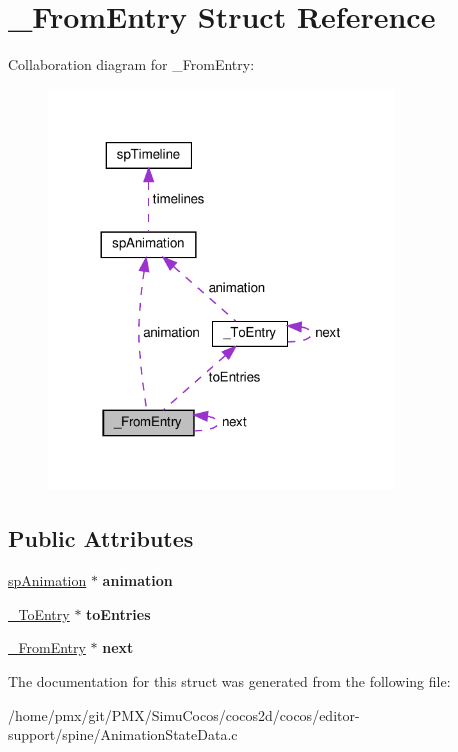 \hypertarget{struct__FromEntry}{}\section{\+\_\+\+From\+Entry Struct Reference}
\label{struct__FromEntry}


Collaboration diagram for \+\_\+\+From\+Entry\+:
\nopagebreak
\begin{figure}[H]
\begin{center}
\leavevmode
\includegraphics[width=260pt]{struct__FromEntry__coll__graph}
\end{center}
\end{figure}
\subsection*{Public Attributes}
\begin{DoxyCompactItemize}
\item 
\mbox{\label{struct__FromEntry_ac971a5aa97313ea22fdb7a9aa4e5c5d7}} 
\hyperlink{structspAnimation}{sp\+Animation} $\ast$ {\bfseries animation}
\item 
\mbox{\label{struct__FromEntry_ae0ada9f41fc11ec7579f0f232bf7cd89}} 
\hyperlink{struct__ToEntry}{\+\_\+\+To\+Entry} $\ast$ {\bfseries to\+Entries}
\item 
\mbox{\label{struct__FromEntry_a93cf2bef97b1218ad02af65cc0a65ad9}} 
\hyperlink{struct__FromEntry}{\+\_\+\+From\+Entry} $\ast$ {\bfseries next}
\end{DoxyCompactItemize}


The documentation for this struct was generated from the following file\+:\begin{DoxyCompactItemize}
\item 
/home/pmx/git/\+P\+M\+X/\+Simu\+Cocos/cocos2d/cocos/editor-\/support/spine/Animation\+State\+Data.\+c\end{DoxyCompactItemize}
